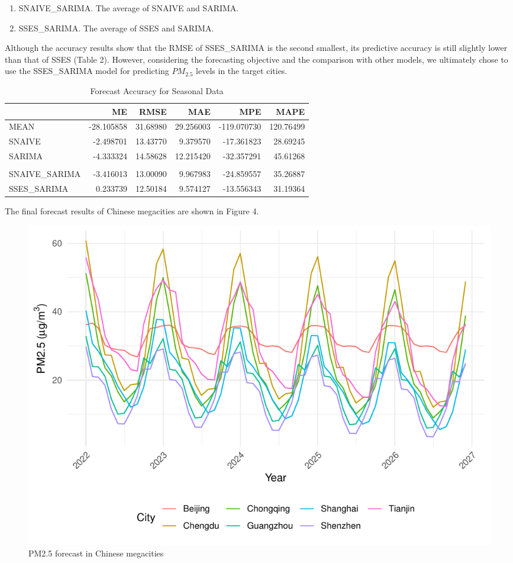 \documentclass[
  12pt,
]{article}
\providecommand{\tightlist}{%
  \setlength{\itemsep}{0pt}\setlength{\parskip}{0pt}}
\begin{document}
\begin{enumerate}
\def\labelenumi{\arabic{enumi}.}
\setcounter{enumi}{4}
\tightlist
\item
  SNAIVE\_SARIMA. The average of SNAIVE and SARIMA.
\item
  SSES\_SARIMA. The average of SSES and SARIMA.
\end{enumerate}

Although the accuracy results show that the RMSE of SSES\_SARIMA is the
second smallest, its predictive accuracy is still slightly lower than
that of SSES (Table 2). However, considering the forecasting objective
and the comparison with other models, we ultimately chose to use the
SSES\_SARIMA model for predicting \(PM_{2.5}\) levels in the target
cities.

\begin{table}

\caption{\label{tab:accuacy_table2}Forecast Accuracy for Seasonal Data}
\centering
\begin{tabular}[t]{l|r|r|r|r|r}
\hline
  & ME & RMSE & MAE & MPE & MAPE\\
\hline
MEAN & -28.105858 & 31.68980 & 29.256003 & -119.070730 & 120.76499\\
\hline
SNAIVE & -2.498701 & 13.43770 & 9.379570 & -17.361823 & 28.69245\\
\hline
SARIMA & -4.333324 & 14.58628 & 12.215420 & -32.357291 & 45.61268\\
\hline
\cellcolor{gray!6}{SSES} & \cellcolor{gray!6}{4.800801} & \cellcolor{gray!6}{12.30076} & \cellcolor{gray!6}{7.793640} & \cellcolor{gray!6}{5.244604} & \cellcolor{gray!6}{19.64161}\\
\hline
SNAIVE\_SARIMA & -3.416013 & 13.00090 & 9.967983 & -24.859557 & 35.26887\\
\hline
SSES\_SARIMA & 0.233739 & 12.50184 & 9.574127 & -13.556343 & 31.19364\\
\hline
\end{tabular}
\end{table}

The final forecast results of Chinese megacities are shown in Figure 4.

\begin{figure}
\centering
\includegraphics{LiFangRenZhang_ENV872_Project_files/figure-latex/forecast figure-1.pdf}
\caption{PM2.5 forecast in Chinese megacities}
\end{figure}
\end{document}
